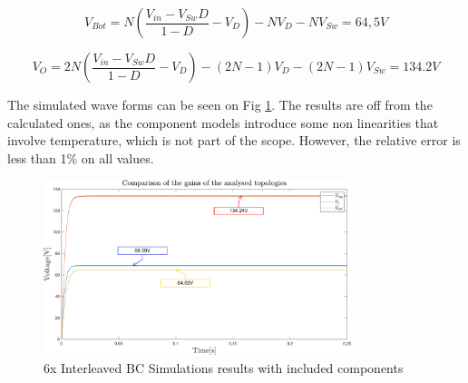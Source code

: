 \begin{equation}
	V_{Bot}= N(\frac{V_{in}-V_{Sw}D}{1-D}-V_D)-NV_D-NV_{Sw}= 64,5V
	\label{eq:DROPS_V_BOT_SIM}
\end{equation}

\begin{equation}
	V_{O}=2N(\frac{V_{in}-V_{Sw}D}{1-D}-V_D)-(2N-1)V_D-(2N-1)V_{Sw}= 134.2V
	\label{eq:DROPS_2INX_FINAL_SIM}
\end{equation}


The simulated wave forms can be seen on Fig \ref{fig:MBC_2NxSimResult_DROPS}. The results are off from the calculated ones, as the component models introduce some non linearities that involve temperature, which is not part of the scope. However, the relative error is less than 1\% on all values. 

\begin{figure}[H]
   \centering
   \includegraphics[width=0.8\textwidth]{figures/zComponentDrops/compare_LTSpice.pdf}
    \caption{6x Interleaved BC Simulations results with included components}
	\label{fig:MBC_2NxSimResult_DROPS}
\end{figure}

